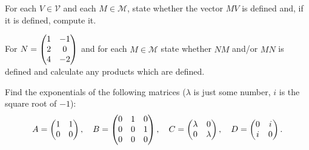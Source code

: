 \documentclass{article}
\begin{document}
\begin{Exercise}\label{exr:matvec}
For each \(V\in\mathcal{V}\) and each \(M\in\mathcal{M}\), state
whether the vector \(MV\) is defined and, if it is defined, compute
it.


\end{Exercise}
\begin{Exercise}\label{exr:matmul}
For \(N=\begin{pmatrix} 1 & -1\\ 2 & 0 \\ 4 & -2\end{pmatrix}\) and for each
\(M\in\mathcal{M}\) state whether \(NM\) and/or \(MN\) is defined
and calculate any products which are defined.


\end{Exercise}
\begin{Exercise}\label{exr:exp}
Find the exponentials of the following matrices (\(\lambda\) is just
some number, \(i\) is the square root of \(-1\)): \[A=\begin{pmatrix} 1 & 1 \\ 0
& 0\end{pmatrix},\quad B=\begin{pmatrix} 0 & 1 & 0 \\ 0 & 0 & 1 \\ 0 & 0 & 0\end{pmatrix},\quad
C=\begin{pmatrix} \lambda & 0 \\ 0 & \lambda\end{pmatrix},\quad D=\begin{pmatrix} 0 & i \\ i & 0\end{pmatrix}.\]




\end{Exercise}
\newpage
\end{document}
